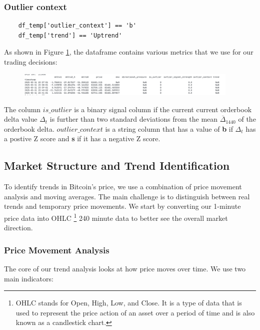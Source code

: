 \documentclass[12pt]{article}
\begin{document}
\subsubsection{Outlier context}


\begin{verbatim}
    df_temp['outlier_context'] == 'b'
    df_temp['trend'] == 'Uptrend'
\end{verbatim}

As shown in Figure \ref{fig:outlier_context}, the dataframe contains various metrics that we use for our trading decisions:

\begin{figure}[h]
    \centering
    \includegraphics[width=0.95\textwidth]{imgs/dataframeHead.png}
    \caption{}
    \label{fig:outlier_context}
\end{figure}


The column $is\_outlier$ is a binary signal column if the current current orderbook delta value $\Delta_t$ is further than two standard deviations from the mean $\overline{\Delta}_{1440}$ of the orderbook delta.
$outlier\_context$ is a string column that has a value of \textbf{b} if $\Delta_t$ has a postive Z score and \textbf{s} if it has a negative Z score.

\subsection{Market Structure and Trend Identification}

To identify trends in Bitcoin's price, we use a combination of price movement analysis and moving averages. The main challenge is to distinguish between real trends and temporary price movements. We start by converting our 1-minute price data into OHLC \footnote{OHLC stands for Open, High, Low, and Close. It is a type of data that is used to represent the price action of an asset over a period of time and is also known as a candlestick chart.} 240 minute data to better see the overall market direction.

\subsubsection{Price Movement Analysis}
The core of our trend analysis looks at how price moves over time. We use two main indicators:
\end{document}
